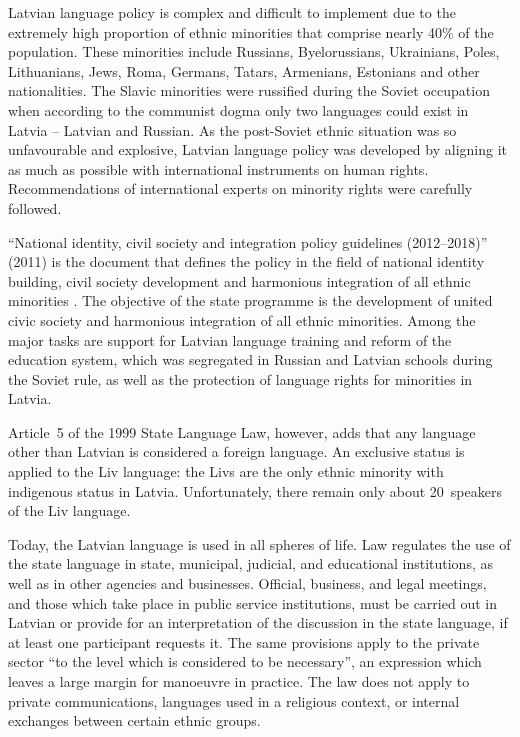 \begin{multicols}{2}

Latvian language policy is complex and difficult to implement due to the extremely high proportion of ethnic minorities that comprise nearly 40\% of the population.  These minorities include Russians, Byelorussians, Ukrainians, Poles, Lithuanians, Jews, Roma, Germans, Tatars, Armenians, Estonians and other nationalities.  The Slavic minorities were russified during the Soviet occupation when according to the communist dogma only two languages could exist in Latvia -- Latvian and Russian.  As the post-Soviet ethnic situation was so unfavourable and explosive, Latvian language policy was developed by aligning it as much as possible with international instruments on human rights.  Recommendations of international experts on minority rights were carefully followed.

``National identity, civil society and integration policy guidelines (2012--2018)'' (2011) is the document that defines the policy in the field of national identity building, civil society development  and harmonious integration of all ethnic minorities \cite{Meta3}.
The objective of the state programme is the development of united civic society and harmonious integration of all ethnic minorities. 
Among the major tasks are support for Latvian language training and reform of the education system, which was segregated in Russian and Latvian schools during the Soviet rule, as well as the protection of language rights for minorities in Latvia.

Article~5 of the 1999 State Language Law, however, adds that any language other than Latvian is considered a foreign language.  An exclusive status is applied to the Liv language: the Livs are the only ethnic minority with indigenous status in Latvia.  Unfortunately, there remain only about 20~speakers of the Liv language.

Today, the Latvian language is used in all spheres of life.  Law regulates the use of the state language in state, municipal, judicial, and educational institutions, as well as in other agencies and businesses.  Official, business, and legal meetings, and those which take place in public service institutions, must be carried out in Latvian or provide for an interpretation of the discussion in the state language, if at least one participant requests it.  The same provisions apply to the private sector ``to the level which is considered to be necessary'', an expression which leaves a large margin for manoeuvre in practice.  The law does not apply to private communications, languages used in a religious context, or internal exchanges between certain ethnic groups.


\end{multicols}

